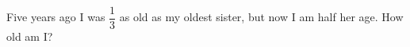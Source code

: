Five years ago I was $\dfrac13$ as old as my oldest sister, but now I am half her age. How old am I?
